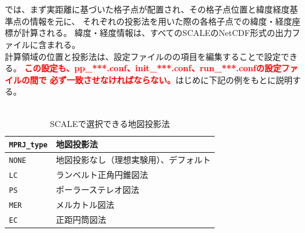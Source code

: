 \section{\SecAdvanceMapprojectionSetting} \label{subsec:adv_mapproj}
\scalerm では、まず実距離に基づいた格子点が配置され、その格子点位置と緯度経度基準点の情報を元に、
それぞれの投影法を用いた際の各格子点での緯度・経度座標が計算される。
緯度・経度情報は、すべてのSCALEのNetCDF形式の出力ファイルに含まれる。\\
計算領域の位置と投影法は、設定ファイルのの項目を編集することで設定できる。
\textcolor{red}{\bf この設定も、pp\_***.conf、init\_***.conf、run\_***.confの設定ファイルの間で
必ず一致させなければならない。}はじめに下記の例をもとに説明する。\\

\\

\begin{table}[b]
\begin{center}
\caption{SCALEで選択できる地図投影法}
\begin{tabularx}{150mm}{|l|X|} \hline
 \rowcolor[gray]{0.9} \verb|MPRJ_type| & 地図投影法 \\ \hline
 \verb|NONE| & 地図投影なし（理想実験用）、デフォルト \\ \hline
 \verb|LC|   & ランベルト正角円錐図法              \\ \hline
 \verb|PS|   & ポーラーステレオ図法                \\ \hline
 \verb|MER|  & メルカトル図法                     \\ \hline
 \verb|EC|   & 正距円筒図法                       \\ \hline
\end{tabularx}
\label{tab:map_proj}
\end{center}
\end{table}

